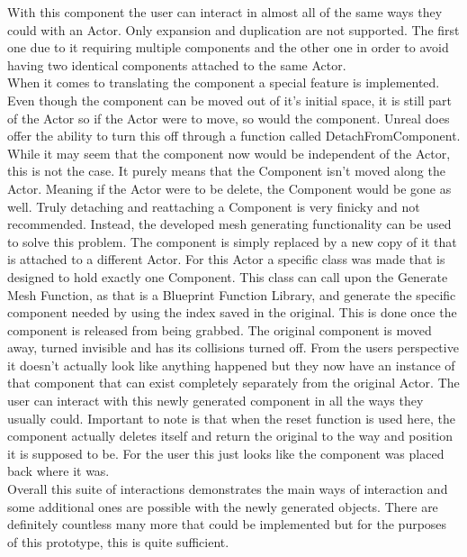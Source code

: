With this component the user can interact in almost all of the same ways they could with an Actor. Only expansion and duplication are not supported. The first one due to it requiring multiple components and the other one in order to avoid having two identical components attached to the same Actor.\\
When it comes to translating the component a special feature is implemented. Even though the component can be moved out of it's initial space, it is still part of the Actor so if the Actor were to move, so would the component. Unreal does offer the ability to turn this off through a function called DetachFromComponent. While it may seem that the component now would be independent of the Actor, this is not the case. It purely means that the Component isn't moved along the Actor. Meaning if the Actor were to be delete, the Component would be gone as well. Truly detaching and reattaching a Component is very finicky and not recommended. Instead, the developed mesh generating functionality can be used to solve this problem. The component is simply replaced by a new copy of it that is attached to a different Actor. For this Actor a specific class was made that is designed to hold exactly one Component. This class can call upon the Generate Mesh Function, as that is a Blueprint Function Library, and generate the specific component needed by using the index saved in the original. This is done once the component is released from being grabbed. The original component is moved away, turned invisible and has its collisions turned off. From the users perspective it doesn't actually look like anything happened but they now have an instance of that component that can exist completely separately from the original Actor. The user can interact with this newly generated component in all the ways they usually could. Important to note is that when the reset function is used here, the component actually deletes itself and return the original to the way and position it is supposed to be. For the user this just looks like the component was placed back where it was.\\
Overall this suite of interactions demonstrates the main ways of interaction and some additional ones are possible with the newly generated objects. There are definitely countless many more that could be implemented but for the purposes of this prototype, this is quite sufficient. 






